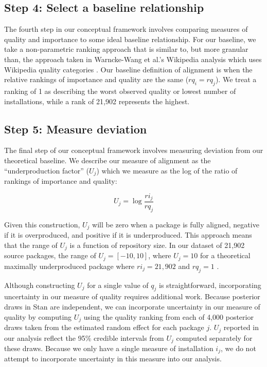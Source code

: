 \documentclass[10pt,conference]{IEEEtran}\usepackage[]{graphicx}\usepackage[usenames,dvipsnames]{color}
\begin{document}
\subsection{Step 4: Select a baseline relationship}
\label{sec:step4}

The fourth step in our conceptual framework involves comparing measures of quality and importance to some ideal baseline relationship. For our baseline, we take a non-parametric ranking approach that is similar to, but more granular than, the approach taken in Warncke-Wang et al.'s Wikipedia analysis which uses Wikipedia quality categories \cite{warncke-wang_misalignment_2015}. Our baseline definition of alignment is when the relative rankings of importance and quality are the same ($rq_i = rq_j$). We treat a ranking of 1 as describing the worst observed quality or lowest number of installations, while a rank of 21,902 represents the highest.


\subsection{Step 5: Measure deviation}
\label{sec:step5}

The final step of our conceptual framework involves measuring deviation from our theoretical baseline. We describe our measure of alignment as the ``underproduction factor'' ($U_j$) which we measure as the log of the ratio of rankings of importance and quality:

\begin{equation*}
U_{j} = \log{\frac{ri_j}{rq_{j}}}
\end{equation*}


\noindent Given this construction, $U_{j}$ will be zero when a package is fully aligned, negative if it is overproduced, and positive if it is underproduced. This approach means that the range of $U_j$ is a function of repository size. In our dataset of 21,902 source packages, the range of $U_j = [-10, 10]$, where $U_j=10$ for a theoretical maximally underproduced package where $ri_j = 21,902$ and $rq_j = 1$ .

Although constructing $U_j$ for a single value of $q_j$ is straightforward, incorporating uncertainty in our measure of quality requires additional work. 
Because posterior draws in Stan are independent, we can incorporate uncertainty in our measure of quality by computing $U_{j}$ using the quality ranking from each of 4,000 posterior draws taken from the estimated random effect for each package $j$.
$U_j$ reported in our analysis reflect the 95\% credible intervals from $U_j$ computed separately for these draws. Because we only have a single measure of installation $i_j$, we do not attempt to incorporate uncertainty in this measure into our analysis.
\end{document}
